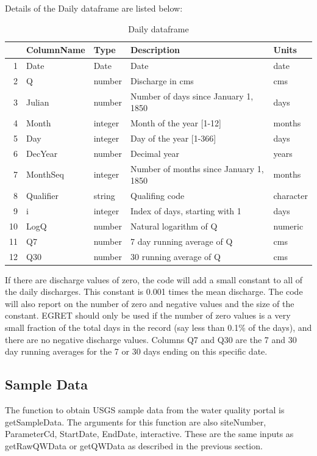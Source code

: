 \documentclass[a4paper,11pt]{article}\usepackage[]{graphicx}\usepackage[]{color}
\begin{document}
Details of the Daily dataframe are listed below:

\begin{table}[ht]
\centering
\begin{tabular}{rllll}
  \hline
 & ColumnName & Type & Description & Units \\ 
  \hline
1 & Date & Date & Date & date \\ 
  2 & Q & number & Discharge in cms & cms \\ 
  3 & Julian & number & Number of days since January 1, 1850 & days \\ 
  4 & Month & integer & Month of the year [1-12] & months \\ 
  5 & Day & integer & Day of the year [1-366] & days \\ 
  6 & DecYear & number & Decimal year & years \\ 
  7 & MonthSeq & integer & Number of months since January 1, 1850 & months \\ 
  8 & Qualifier & string & Qualifing code & character \\ 
  9 & i & integer & Index of days, starting with 1 & days \\ 
  10 & LogQ & number & Natural logarithm of Q & numeric \\ 
  11 & Q7 & number & 7 day running average of Q & cms \\ 
  12 & Q30 & number & 30 running average of Q & cms \\ 
   \hline
\end{tabular}
\caption{Daily dataframe} 
\end{table}




If there are discharge values of zero, the code will add a small constant to all of the daily discharges.  This constant is 0.001 times the mean discharge.  The code will also report on the number of zero and negative values and the size of the constant.  EGRET should only be used if the number of zero values is a very small fraction of the total days in the record (say less than 0.1\% of the days), and there are no negative discharge values.  Columns Q7 and Q30 are the 7 and 30 day running averages for the 7 or 30 days ending on this specific date.

\FloatBarrier

\subsection{Sample Data}
The function to obtain USGS sample data from the water quality portal is getSampleData. The arguments for this function are also siteNumber, ParameterCd, StartDate, EndDate, interactive. These are the same inputs as getRawQWData or getQWData as described in the previous section.
\end{document}
